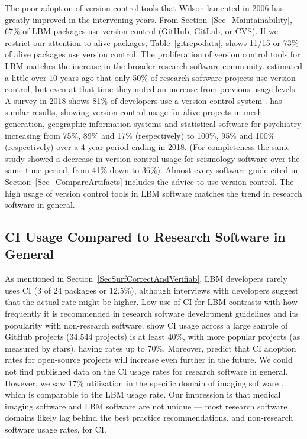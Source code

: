 \documentclass[final, 3p, times, authoryear]{elsarticle}
\begin{document}
The poor adoption of version control tools that Wilson lamented in 2006
\citep{Wilson2006} has greatly improved in the intervening years.  From
Section~\ref{Sec_Maintainability}, 67\% of LBM packages use version control
(GitHub, GitLab, or CVS). If we restrict our attention to alive packages,
Table~\ref{gitrepodata}, shows 11/15 or 73\% of alive packages use version
control. The proliferation of version control tools for LBM matches the increase
in the broader research software community. \citet{Nguyen-HoanEtAl2010}
estimated a little over 10 years ago that only 50\% of research software
projects use version control, but even at that time they noted an increase from
previous usage levels. A survey in 2018 shows 81\% of developers use a version
control system \citep{AlNoamanyAndBorghi2018}. \citet{Smith2018} has similar
results, showing version control usage for alive projects in mesh generation,
geographic information systems and statistical software for psychiatry
increasing from 75\%, 89\% and 17\% (respectively) to 100\%, 95\% and 100\%
(respectively) over a 4-year period ending in 2018.  (For completeness the same
study showed a decrease in version control usage for seismology software over
the same time period, from 41\% down to 36\%).  Almost every software guide
cited in Section~\ref{Sec_CompareArtifacts} includes the advice to use version
control. The high usage of version control tools in LBM software matches the
trend in research software in general.

\subsection{CI Usage Compared to Research Software in General} \label{Sec_CI}

As mentioned in Section~\ref{SecSurfCorrectAndVerifiab}, LBM developers rarely
uses CI (3 of 24 packages or 12.5\%), although interviews with developers
suggest that the actual rate might be higher. Low use of CI for LBM contrasts
with how frequently it is recommended in research software development
guidelines
\citep{BrettEtAl2021, Brown2015, ThielEtAl2020, Zadka2018, vanGompelEtAl2016}
and its popularity with non-research software. \citet{HiltonEtAl2016} show CI
usage across a large sample of GitHub projects (34,544 projects) is at least
40\%, with more popular projects (as measured by stars), having rates up to
70\%. Moreover, \citet{HiltonEtAl2016} predict that CI adoption rates for
open-source projects will increase even further in the future.  We could not
find published data on the CI usage rates for research software in general.
However, we saw 17\% utilization in the specific domain of imaging software
\citep{Dong2021}, which is comparable to the LBM usage rate. Our impression is
that medical imaging software and LBM software are not unique --- most research
software domains likely lag behind the best practice recommendations, and
non-research software usage rates, for CI.
\end{document}
